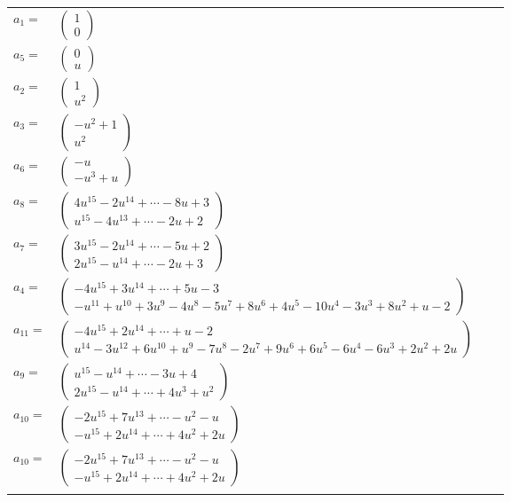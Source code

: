 \documentclass[1p]{elsarticle_modified}
\theoremstyle{definition}
\begin{document}
\begin{tabular}{m{7pt} m{180pt} m{7pt} m{180pt} }
\flushright $a_{1}=$&$\begin{pmatrix}1\\0\end{pmatrix}$ \\
\flushright $a_{5}=$&$\begin{pmatrix}0\\u\end{pmatrix}$ \\
\flushright $a_{2}=$&$\begin{pmatrix}1\\u^2\end{pmatrix}$ \\
\flushright $a_{3}=$&$\begin{pmatrix}- u^2+1\\u^2\end{pmatrix}$ \\
\flushright $a_{6}=$&$\begin{pmatrix}- u\\- u^3+u\end{pmatrix}$ \\
\flushright $a_{8}=$&$\begin{pmatrix}4 u^{15}-2 u^{14}+\cdots-8 u+3\\u^{15}-4 u^{13}+\cdots-2 u+2\end{pmatrix}$ \\
\flushright $a_{7}=$&$\begin{pmatrix}3 u^{15}-2 u^{14}+\cdots-5 u+2\\2 u^{15}- u^{14}+\cdots-2 u+3\end{pmatrix}$ \\
\flushright $a_{4}=$&$\begin{pmatrix}-4 u^{15}+3 u^{14}+\cdots+5 u-3\\- u^{11}+u^{10}+3 u^9-4 u^8-5 u^7+8 u^6+4 u^5-10 u^4-3 u^3+8 u^2+u-2\end{pmatrix}$ \\
\flushright $a_{11}=$&$\begin{pmatrix}-4 u^{15}+2 u^{14}+\cdots+u-2\\u^{14}-3 u^{12}+6 u^{10}+u^9-7 u^8-2 u^7+9 u^6+6 u^5-6 u^4-6 u^3+2 u^2+2 u\end{pmatrix}$ \\
\flushright $a_{9}=$&$\begin{pmatrix}u^{15}- u^{14}+\cdots-3 u+4\\2 u^{15}- u^{14}+\cdots+4 u^3+u^2\end{pmatrix}$ \\
\flushright $a_{10}=$&$\begin{pmatrix}-2 u^{15}+7 u^{13}+\cdots- u^2- u\\- u^{15}+2 u^{14}+\cdots+4 u^2+2 u\end{pmatrix}$\\ \flushright $a_{10}=$&$\begin{pmatrix}-2 u^{15}+7 u^{13}+\cdots- u^2- u\\- u^{15}+2 u^{14}+\cdots+4 u^2+2 u\end{pmatrix}$\\&\end{tabular}
\end{document}
